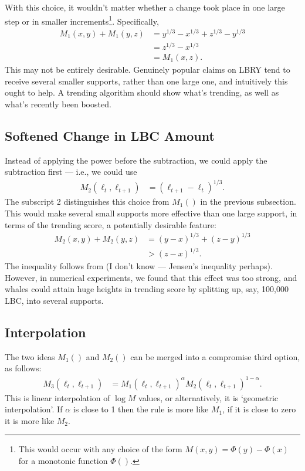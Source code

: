 \documentclass[a4paper, 12pt]{article}
\begin{document}
With this choice, it wouldn't matter whether a change took place in one large
step or in smaller increments\footnote{This would occur with any
choice of the form $M(x, y) = \Phi(y) - \Phi(x)$ for a monotonic function
$\Phi()$.}. Specifically,
\begin{align}
M_1(x, y) + M_1(y, z)
    &= y^{1/3} - x^{1/3} + z^{1/3} - y^{1/3} \\
    &= z^{1/3} - x^{1/3} \\
    &= M_1(x, z).
\end{align}
This may not be entirely desirable. Genuinely popular claims on LBRY tend
to receive several smaller supports, rather than one large one, and intuitively
this ought to help. A trending algorithm should show what's trending,
as well as what's recently been boosted.


\subsection{Softened Change in LBC Amount}
Instead of applying the power before the subtraction, we could apply the
subtraction first --- i.e., we could use
\begin{align}
M_2(\ell_t, \ell_{t+1}) &= \left(\ell_{t+1} - \ell_t\right)^{1/3}.
\end{align}
The subscript 2 distinguishes this choice from $M_1()$ in the previous
subsection.
This would make several small supports more effective than one large support,
in terms of the trending score, a potentially desirable feature:
\begin{align}
M_2(x, y) + M_2(y, z)
    &= (y - x)^{1/3} + (z - y)^{1/3} \\
    &> (z - x)^{1/3}.
\end{align}
The inequality follows from (I don't know --- Jensen's inequality perhaps).
However, in numerical experiments, we found that this effect was too strong,
and whales could attain huge heights in trending score by splitting up, say,
100,000 LBC, into several supports.

\subsection{Interpolation}
The two ideas $M_1()$ and $M_2()$ can be merged into a compromise third option,
as follows:
\begin{align}
M_3(\ell_t, \ell_{t+1}) &= M_1(\ell_t, \ell_{t+1})^\alpha
                           M_2(\ell_t, \ell_{t+1})^{1 - \alpha}. \label{eqn:spike_mass}
\end{align}
This is linear interpolation of $\log M$ values, or alternatively, it is
`geometric interpolation'. If $\alpha$ is close to 1 then the rule is more
like $M_1$, if it is close to zero it is more like $M_2$.
\end{document}
